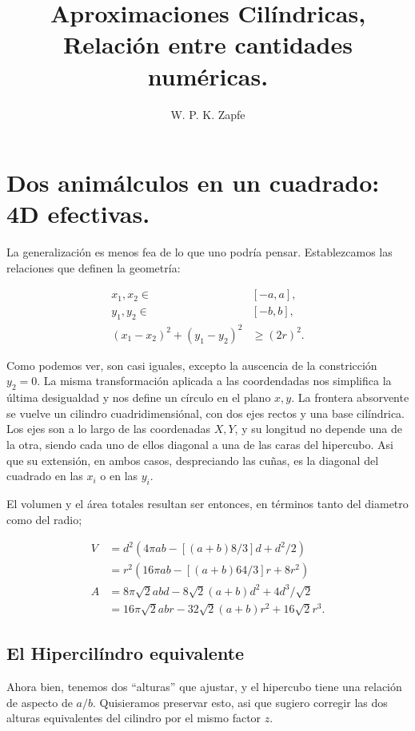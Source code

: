 \documentclass[letterpaperr,12pt]{article}
\title{Aproximaciones Cilíndricas, Relación entre cantidades numéricas.}
\author{W. P. K. Zapfe}
\begin{document}
\maketitle


\section{Dos animálculos en un cuadrado: 4D efectivas.}

La generalización es menos fea de lo que uno podría pensar.
Establezcamos las relaciones que definen la geometría:

\begin{align}
x_1,x_2 \in  & [ -a, a], \\
y_1, y_2\in & [ -b, b], \\
(x_1-x_2)^2+(y_1-y_2)^2 & \ge (2 r)^2.
\end{align}

Como podemos ver, son casi iguales, excepto la auscencia de la
constricción $y_2=0$. La misma transformación aplicada a 
las coordendadas nos simplifica la última desigualdad
y nos define un círculo en el plano $x,y$. La frontera
absorvente se vuelve un cilindro cuadridimensiónal, con
dos ejes rectos y una base cilíndrica. Los ejes son a lo largo de
las coordenadas $X,Y$, y su longitud no depende una de la otra, siendo
cada uno de ellos diagonal a una de las caras del hipercubo. Asi
que su extensión, en ambos casos, despreciando las cuñas, es la
diagonal del cuadrado en las $x_i$ o en las $y_i$.

El volumen y el área totales resultan ser entonces, en
términos tanto del diametro como del radio;

\begin{align}
 V & = d^2(4\pi ab - [(a+b)8/3] d +d^2/2) \\
 & = r ^2(16\pi ab - [(a+b)64/3] r +8 r^2)  \\
A & = 8\pi\sqrt{2} a b d -8 \sqrt{2}(a+b) d^2 +4 d^3/\sqrt{2} \\
 & =  16\pi\sqrt{2} a b r  -32 \sqrt{2}(a+b) r^2 +16  \sqrt{2} r^3.
\end{align}

\subsection{El Hipercilíndro equivalente}

Ahora bien, tenemos dos ``alturas'' que ajustar, y el
 hipercubo
tiene una relación de aspecto de $a/b$. Quisieramos
preservar esto, asi que sugiero corregir las dos alturas
equivalentes del cilindro por el mismo factor $z$.
\end{document}
